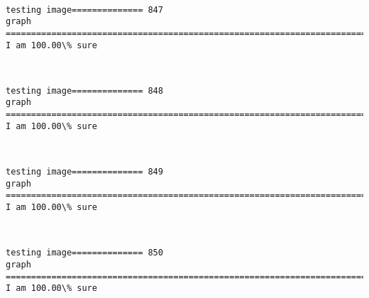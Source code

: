 \documentclass[11pt]{article}
\begin{document}
    \begin{center}
    \end{center}
    { \hspace*{\fill} \\}
    
    \begin{Verbatim}[commandchars=\\\{\}]
testing image============== 847
graph
============================================================================
I am 100.00\% sure

    \end{Verbatim}

    \begin{center}
    \end{center}
    { \hspace*{\fill} \\}
    
    \begin{Verbatim}[commandchars=\\\{\}]
testing image============== 848
graph
============================================================================
I am 100.00\% sure

    \end{Verbatim}

    \begin{center}
    \end{center}
    { \hspace*{\fill} \\}
    
    \begin{Verbatim}[commandchars=\\\{\}]
testing image============== 849
graph
============================================================================
I am 100.00\% sure

    \end{Verbatim}

    \begin{center}
    \end{center}
    { \hspace*{\fill} \\}
    
    \begin{Verbatim}[commandchars=\\\{\}]
testing image============== 850
graph
============================================================================
I am 100.00\% sure

    \end{Verbatim}
\end{document}
